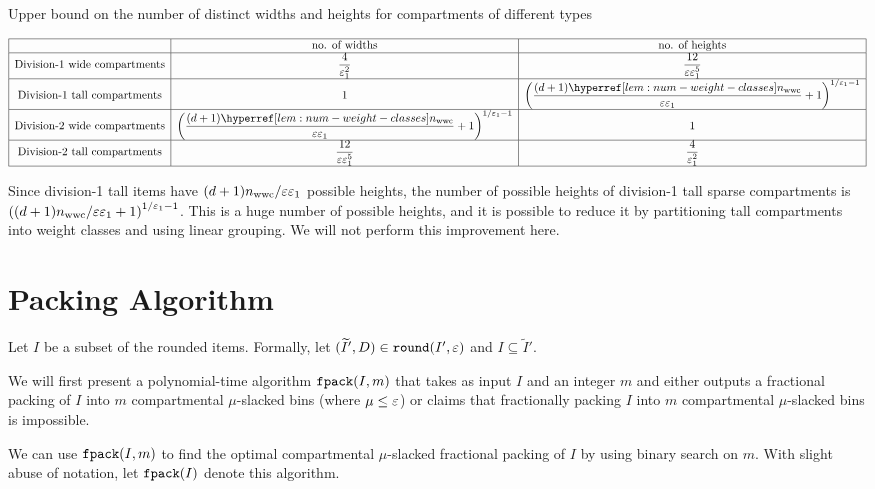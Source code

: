 \begin{table}[htb]
\centering
\caption{Upper bound on the number of distinct widths and heights for
compartments of different types}
${\displaystyle \begin{array}{*3{|>{\displaystyle}c}|}
\hline & \textrm{no. of widths} & \textrm{no. of heights}
\\ \hline \textrm{Division-1 wide compartments}
    & \frac{4}{\epsLarge^2}
    & \frac{12}{\eps\epsLarge^5}
\\ \hline \textrm{Division-1 tall compartments}
    & 1
    & \left(\frac{(d+1)\nwwcHyp}{\eps\epsLarge} + 1\right)^{1/\epsLarge-1}
\\ \hline \textrm{Division-2 wide compartments}
    & \left(\frac{(d+1)\nwwcHyp}{\eps\epsLarge} + 1\right)^{1/\epsLarge-1}
    & 1
\\ \hline \textrm{Division-2 tall compartments}
    & \frac{12}{\eps\epsLarge^5}
    & \frac{4}{\epsLarge^2}
\\ \hline
\end{array} }$
\end{table}

Since division-1 tall items have $(d+1)n_{\mathrm{wwc}}/\varepsilon\varepsilon_1$ possible heights,
the number of possible heights of division-1 tall sparse compartments is
$\left((d+1)n_{\mathrm{wwc}}/\varepsilon\varepsilon_1 + 1\right)^{1/\varepsilon_1-1}$.
This is a huge number of possible heights, and it is possible to reduce it by partitioning
tall compartments into weight classes and using linear grouping.
We will not perform this improvement here.

\section{Packing Algorithm}
\label{sec:gv-rbbp:pack}

Let $I$ be a subset of the rounded items. Formally,
let $(\widetilde{I}', D) \in \operatorname{\mathtt{round}}(I', \varepsilon)$ and $I \subseteq \widetilde{I}'$.

We will first present a polynomial-time algorithm
$\operatorname{\mathtt{fpack}}(I, m)$ that takes as input $I$ and an integer $m$ and either outputs
a fractional packing of $I$ into $m$ compartmental $\mu$-slacked bins
(where $\mu \le \varepsilon$) or claims that fractionally packing $I$ into $m$
compartmental $\mu$-slacked bins is impossible.

We can use $\operatorname{\mathtt{fpack}}(I, m)$ to find the optimal compartmental $\mu$-slacked
fractional packing of $I$ by using binary search on $m$.
With slight abuse of notation, let $\operatorname{\mathtt{fpack}}(I)$ denote this algorithm.

